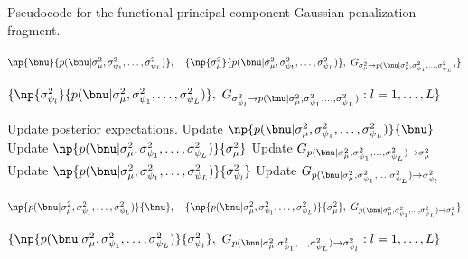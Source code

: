 \documentclass[12pt]{article}
\def\sigsqmu{\sigma^2_{\mu}}
\newcommand\sigsqpsi[1]{\sigma^2_{\psi_{#1}}}
\theoremstyle{plain}
\theoremstyle{definition}
\theoremstyle{remark}
\begin{document}
\begin{algorithm}
	\caption{
		Pseudocode for the functional principal component Gaussian penalization fragment.
	}
	\label{alg:mean_fpc_gauss_pen_frag}
	\begin{algorithmic}[1]
		\Inputs
			\begin{varwidth}[t]{\linewidth} $
				\np{\bnu}{p (\bnu | \sigsqmu, \sigsqpsi{1}, \dots, \sigsqpsi{L})}, \quad
				\{
					\np{\sigsqmu}{p (\bnu | \sigsqmu, \sigsqpsi{1}, \dots, \sigsqpsi{L})}, \
					G_{\sigsqmu \rightarrow p (\bnu | \sigsqmu, \sigsqpsi{1}, \dots, \sigsqpsi{L})}
				\}
			$\par$
				\{
					\np{\sigsqpsi{l}}{p (\bnu | \sigsqmu, \sigsqpsi{1}, \dots, \sigsqpsi{L})}, \
					G_{\sigsqpsi{l} \rightarrow p (\bnu | \sigsqmu, \sigsqpsi{1}, \dots, \sigsqpsi{L})} :
					l = 1, \dots, L
				\}
			$ \end{varwidth}
		\Updates
			\State Update posterior expectations.
			\State Update $\np{p (\bnu | \sigsqmu, \sigsqpsi{1}, \dots, \sigsqpsi{L})}{\bnu}$
				\Comment{equation \eqref{np_pen_nu}}
			\State Update $\np{p (\bnu | \sigsqmu, \sigsqpsi{1}, \dots, \sigsqpsi{L})}{\sigsqmu}$
			\State Update $G_{p (\bnu | \sigsqmu, \sigsqpsi{1}, \dots, \sigsqpsi{L}) \rightarrow \sigsqmu}$
			\For{$l = 1, \dots, L$}
				\State Update $\np{p (\bnu | \sigsqmu, \sigsqpsi{1}, \dots, \sigsqpsi{L})}{\sigsqpsi{l}}$
				\State Update $G_{p (\bnu | \sigsqmu, \sigsqpsi{1}, \dots, \sigsqpsi{L}) \rightarrow \sigsqpsi{l}}$
			\EndFor
		\Outputs
			\begin{varwidth}[t]{\linewidth} $
				\np{p (\bnu | \sigsqmu, \sigsqpsi{1}, \dots, \sigsqpsi{L})}{\bnu}, \quad
				\{
					\np{p (\bnu | \sigsqmu, \sigsqpsi{1}, \dots, \sigsqpsi{L})}{\sigsqmu}, \
					G_{p (\bnu | \sigsqmu, \sigsqpsi{1}, \dots, \sigsqpsi{L}) \rightarrow \sigsqmu}
				\}
			$\par$
				\{
					\np{p (\bnu | \sigsqmu, \sigsqpsi{1}, \dots, \sigsqpsi{L})}{\sigsqpsi{l}}, \
					G_{p (\bnu | \sigsqmu, \sigsqpsi{1}, \dots, \sigsqpsi{L}) \rightarrow \sigsqpsi{l}} :
					l = 1, \dots, L
				\}
			$ \end{varwidth}
	\end{algorithmic}
\end{algorithm}

\end{document}
